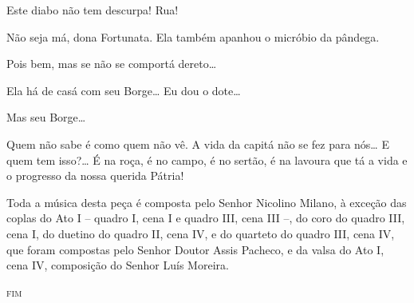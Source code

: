  Este diabo não tem descurpa! Rua!

 Não seja má, dona Fortunata. Ela também apanhou o micróbio da
pândega.

 Pois bem, mas se não se comportá dereto\ldots{} 

  Ela há de casá com seu Borge\ldots{} Eu dou o
dote\ldots{}

 Mas seu Borge\ldots{}

 Quem não sabe é como quem não vê.  A vida da capitá não se
fez para nós\ldots{} E quem tem isso?\ldots{} É na roça, é no campo, é no sertão, é na
lavoura que tá a vida e o progresso da nossa querida Pátria! 



Toda a música desta peça é composta pelo Senhor Nicolino Milano, à exceção
das coplas do Ato I -- quadro I, cena I e quadro III, cena III --, do coro 
do quadro III, cena I, do duetino do quadro II, cena IV, e do quarteto
do quadro III, cena IV, que foram compostas pelo Senhor Doutor Assis Pacheco, 
e da valsa do Ato I, cena IV, composição do Senhor Luís Moreira.

\begin{center}
\textsc{fim}
\end{center}



